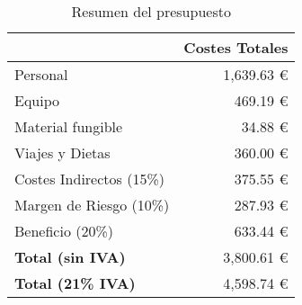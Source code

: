 \begin{table}[H]
	\centering
	\caption{Resumen del presupuesto}
	\label{tab:presupuesto_total}
	\begin{tabular}{|l|r|}
		\hline
		\rowcolor[HTML]{BFBFBF}
		\multicolumn{1}{|c|}{\cellcolor[HTML]{BFBFBF}\textbf{Presupuestos}} & \multicolumn{1}{c|}{\cellcolor[HTML]{BFBFBF}\textbf{Costes Totales}} \\ \hline
		Personal                                                            & 1,639.63 €                                                           \\ \hline
		Equipo                                                              & 469.19 €                                                             \\ \hline
		Material fungible                                                   & 34.88 €                                                              \\ \hline
		Viajes y Dietas                                                     & 360.00 €                                                             \\ \hline
		Costes Indirectos (15\%)                                            & 375.55 €                                                             \\ \hline
		Margen de Riesgo (10\%)                                             & 287.93 €                                                             \\ \hline
		Beneficio (20\%)                                                    & 633.44 €                                                             \\ \hline
		\textbf{Total (sin IVA)}                                            & 3,800.61 €                                                           \\ \hline
		\textbf{Total (21\% IVA)}                                           & 4,598.74 €                                                           \\ \hline
	\end{tabular}
\end{table}